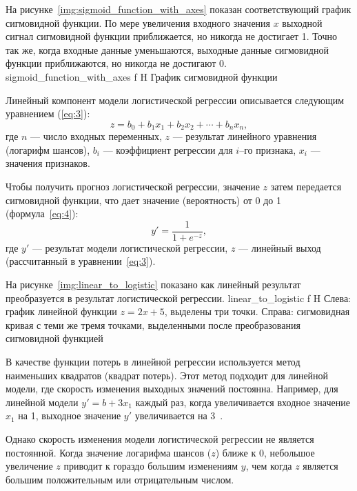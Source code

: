 На рисунке~\ref{img:sigmoid_function_with_axes} показан соответствующий график сигмовидной функции.
По мере увеличения входного значения $x$ выходной сигнал сигмовидной функции приближается, но никогда не достигает 1.
Точно так же, когда входные данные уменьшаются, выходные данные сигмовидной функции приближаются, но никогда не достигают 0.
{sigmoid_function_with_axes}
{f}
{H}
{\textwidth}
{График сигмовидной функции}

Линейный компонент модели логистической регрессии описывается следующим уравнением (\ref{eq:3}):
\begin{equation}
    z = b_0 + b_1 x_1 + b_2 x_2 +\cdots + b_n x_n,
    \label{eq:3}
\end{equation}
где $n$ --- число входных переменных, $z$ --- результат линейного уравнения (логарифм шансов), $b_i$ --- коэффициент регрессии для $i$--го признака, $x_i$ --- значения признаков.

Чтобы получить прогноз логистической регрессии, значение $z$ затем передается сигмовидной функции, что дает значение (вероятность) от 0 до 1 (формула~\ref{eq:4}):
\begin{equation}
    y' = \frac{1}{1 + e^{-z}},
    \label{eq:4}
\end{equation}
где $y'$ --- результат модели логистической регрессии, $z$ --- линейный выход (рассчитанный в уравнении~\ref{eq:3}).

На рисунке~\ref{img:linear_to_logistic} показано как линейный результат преобразуется в результат логистической регрессии.
{linear_to_logistic}
{f}
{H}
{\textwidth}
{Слева: график линейной функции $z = 2x + 5$, выделены три точки. Справа: сигмовидная кривая с теми же тремя точками, выделенными после преобразования сигмовидной функцией}

В качестве функции потерь в линейной регрессии используется метод наименьших квадратов (квадрат потерь).
Этот метод подходит для линейной модели, где скорость изменения выходных значений постоянна.
Например, для линейной модели $y' = b + 3 x_1$ каждый раз, когда увеличивается входное значение $x_1$ на 1, выходное значение $y'$ увеличивается на 3~\cite{google2}.

Однако скорость изменения модели логистической регрессии не является постоянной.
Когда значение логарифма шансов ($z$) ближе к 0, небольшое увеличение $z$ приводит к гораздо большим изменениям $y$, чем когда $z$ является большим положительным или отрицательным числом.

